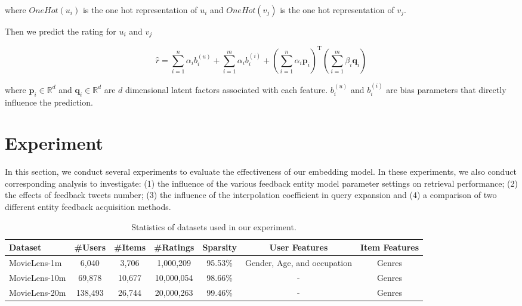 \documentclass{sig-alternate-05-2015}
\begin{document}
where $OneHot(u_i)$ is the one hot representation of $u_i$
and $OneHot(v_j)$ is the one hot representation of $v_j$.

Then we predict the rating for $u_i$ and $v_j$

\begin{equation}
\hat{r} = \sum_{i=1}^{n} \alpha_{i} b_{i}^{(u)} + \sum_{i=1}^{m} \alpha_{i} b_{i}^{(i)} +
\left( \sum_{i=1}^{n} \alpha_{i} \textbf{p}_{i} \right) ^ \mathrm{T}
\left( \sum_{i=1}^{m} \beta_{i} \textbf{q}_{i} \right)
\end{equation}

where $\textbf{p}_{i} \in \mathbb{R}^d$ and $\textbf{q}_{i} \in \mathbb{R}^d$
are $d$ dimensional latent factors associated with each feature.
$b_{i}^{(u)}$ and $b_{i}^{(i)}$ are bias parameters that directly influence the prediction.


\section{Experiment}
In this section, we conduct several experiments to evaluate the effectiveness of our embedding model.
In these experiments, we also conduct corresponding analysis to investigate:
(1) the influence of the various feedback entity model parameter settings on
retrieval performance;
(2) the effects of feedback tweets number;
(3) the influence of the interpolation coefficient in query expansion and
(4) a comparison of two different entity feedback acquisition methods.



\begin{table}[htpb]
	\centering
	\caption{Statistics of datasets used in our experiment.}
	\label{tab:topics}
	\begin{tabular}{|l|c|c|c|c|c|c|}
		\hline
		\textbf{Dataset} & \textbf{\#Users} & \textbf{\#Items} & \textbf{\#Ratings} & \textbf{Sparsity} & \textbf{User Features} & \textbf{Item Features} \\
		\hline
		MovieLens-1m  & 6,040   & 3,706  & 1,000,209  & 95.53\% & Gender, Age, and occupation & Genres \\
		MovieLens-10m & 69,878  & 10,677 & 10,000,054 & 98.66\% & - & Genres \\
		MovieLens-20m & 138,493 & 26,744 & 20,000,263 & 99.46\% & - & Genres \\
		\hline
	\end{tabular}
\end{table}
\end{document}
